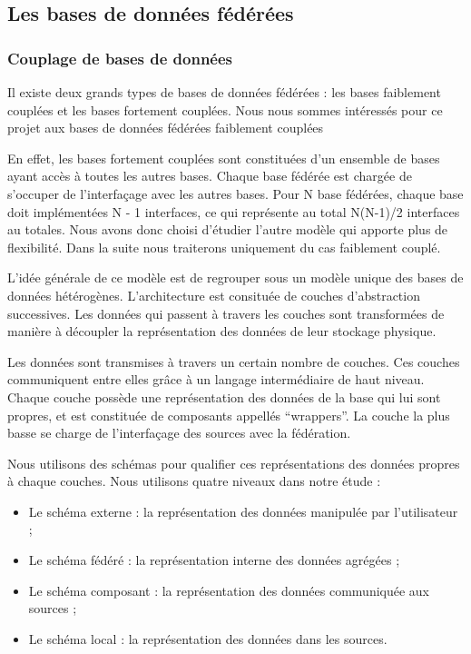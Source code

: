 \subsection{Les bases de données fédérées}

\subsubsection{Couplage de bases de données}

Il existe deux grands types de bases de données fédérées : les bases faiblement couplées et les bases fortement couplées. Nous nous sommes intéressés pour ce projet aux bases de données fédérées faiblement couplées

En effet, les bases fortement couplées sont constituées d’un ensemble de bases ayant accès à toutes les autres bases. Chaque base fédérée est chargée de s’occuper de l’interfaçage avec les autres bases. Pour N base fédérées, chaque base doit implémentées N - 1 interfaces, ce qui représente au total N(N-1)/2 interfaces au totales. Nous avons donc choisi d’étudier l’autre modèle qui apporte plus de flexibilité. Dans la suite nous traiterons uniquement du cas faiblement couplé.

L’idée générale de ce modèle est de regrouper sous un modèle unique des bases de données hétérogènes. L’architecture est consituée de couches d’abstraction successives. Les données qui passent à travers les couches sont transformées de manière à découpler la représentation des données de leur stockage physique.

Les données sont transmises à travers un certain nombre de couches. Ces couches communiquent entre elles grâce à un langage intermédiaire de haut niveau. Chaque couche possède une représentation des données de la base qui lui sont propres, et est constituée de composants appellés “wrappers”. La couche la plus basse se charge de l’interfaçage des sources avec la fédération.

Nous utilisons des schémas pour qualifier ces représentations des données propres à chaque couches. Nous utilisons quatre niveaux dans notre étude :

\begin{itemize}
    \item Le schéma externe : la représentation des données manipulée par l’utilisateur ;

    \item Le schéma fédéré : la représentation interne des données agrégées ;

    \item Le schéma composant : la représentation des données communiquée aux sources ;

    \item Le schéma local : la représentation des données dans les sources.
\end{itemize}

